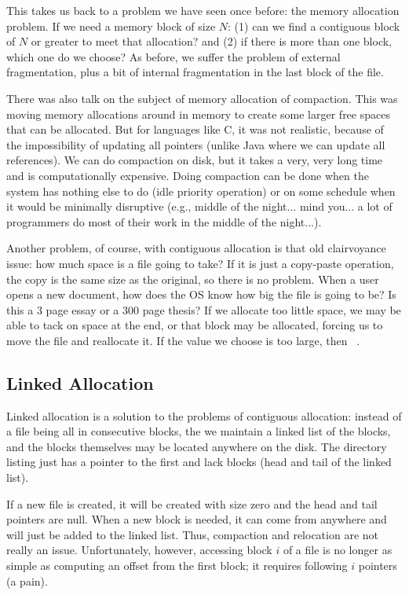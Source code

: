 This takes us back to a problem we have seen once before: the memory allocation problem. If we need a memory block of size $N$: (1) can we find a contiguous block of $N$ or greater to meet that allocation? and (2) if there is more than one block, which one do we choose? As before, we suffer the problem of external fragmentation, plus a bit of internal fragmentation in the last block of the file. 

There was also talk on the subject of memory allocation of compaction. This was moving memory allocations around in memory to create some larger free spaces that can be allocated. But for languages like C, it was not realistic, because of the impossibility of updating all pointers (unlike Java where we can update all references). We can do compaction on disk, but it takes a very, very long time and is computationally expensive. Doing compaction can be done when the system has nothing else to do (idle priority operation) or on some schedule when it would be minimally disruptive (e.g., middle of the night... mind you... a lot of programmers do most of their work in the middle of the night...).

Another problem, of course, with contiguous allocation is that old clairvoyance issue: how much space is a file going to take? If it is just a copy-paste operation, the copy is the same size as the original, so there is no problem. When a user opens a new document, how does the OS know how big the file is going to be? Is this a 3 page essay or a 300 page thesis? If we allocate too little space, we may be able to tack on space at the end, or that block may be allocated, forcing us to move the file and reallocate it. If the value we choose is too large, then ~\cite{osc}.

\subsection*{Linked Allocation}
Linked allocation is a solution to the problems of contiguous allocation: instead of a file being all in consecutive blocks, the we maintain a linked list of the blocks, and the blocks themselves may be located anywhere on the disk. The directory listing just has a pointer to the first and lack blocks (head and tail of the linked list).

If a new file is created, it will be created with size zero and the head and tail pointers are null. When a new block is needed, it can come from anywhere and will just be added to the linked list. Thus, compaction and relocation are not really an issue. Unfortunately, however, accessing block $i$ of a file is no longer as simple as computing an offset from the first block; it requires following $i$ pointers (a pain).

